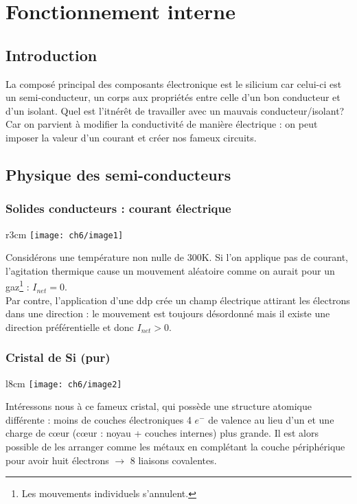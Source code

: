 \chapter{Fonctionnement interne}
\section*{Introduction}
La composé principal des composants électronique est le silicium car celui-ci est
un semi-conducteur, un corps aux propriétés entre celle d'un bon conducteur et 
d'un isolant. Quel est l'itnérêt de travailler avec un mauvais conducteur/isolant? 
Car on parvient à modifier la conductivité de manière électrique : on peut 
imposer la valeur d'un courant et créer nos fameux circuits.

\section{Physique des semi-conducteurs}
	\subsection{Solides conducteurs : courant électrique}
			\begin{wrapfigure}[8]{r}{3cm}
		\vspace{-0.5cm}
		\texttt{[image: ch6/image1]}
		\end{wrapfigure}
	Considérons une température non nulle de 300K. Si l'on applique pas de courant, 
	l'agitation thermique cause un mouvement aléatoire comme on aurait pour un 
	gaz\footnote{Les mouvements individuels s'annulent.} : $I_{net} = 0$. \\
	Par contre, l'application d'une ddp crée un champ électrique attirant les 
	électrons dans une direction : le mouvement est toujours désordonné mais il 
	existe une direction préférentielle et donc $I_{net}>0$.

	\subsection{Cristal de Si (pur)}
			\begin{wrapfigure}[8]{l}{8cm}
		\vspace{-0.5cm}
		\texttt{[image: ch6/image2]}
		\end{wrapfigure}	
	Intéressons nous à ce fameux cristal, qui possède une structure atomique 
	différente : moins de couches électroniques 4 $e^-$ de valence au lieu d'un 
	et une charge de cœur (cœur : noyau + couches internes) plus grande.  Il 
	est alors possible de les arranger comme les métaux en complétant la couche 
	périphérique pour avoir huit électrons $\rightarrow$ 8 liaisons covalentes.\\
	
